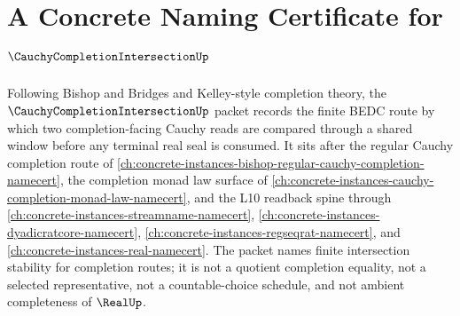 \chapter{A Concrete Naming Certificate for $\CauchyCompletionIntersectionUp$}
\label{ch:concrete-instances-cauchy-completion-intersection-namecert}

Following Bishop and Bridges and Kelley-style completion theory, the $\CauchyCompletionIntersectionUp$ packet records the finite BEDC route by which two completion-facing Cauchy reads are compared through a shared window before any terminal real seal is consumed. It sits after the regular Cauchy completion route of \autoref{ch:concrete-instances-bishop-regular-cauchy-completion-namecert}, the completion monad law surface of \autoref{ch:concrete-instances-cauchy-completion-monad-law-namecert}, and the L10 readback spine through \autoref{ch:concrete-instances-streamname-namecert}, \autoref{ch:concrete-instances-dyadicratcore-namecert}, \autoref{ch:concrete-instances-regseqrat-namecert}, and \autoref{ch:concrete-instances-real-namecert}. The packet names finite intersection stability for completion routes; it is not a quotient completion equality, not a selected representative, not a countable-choice schedule, and not ambient completeness of $\RealUp$.

